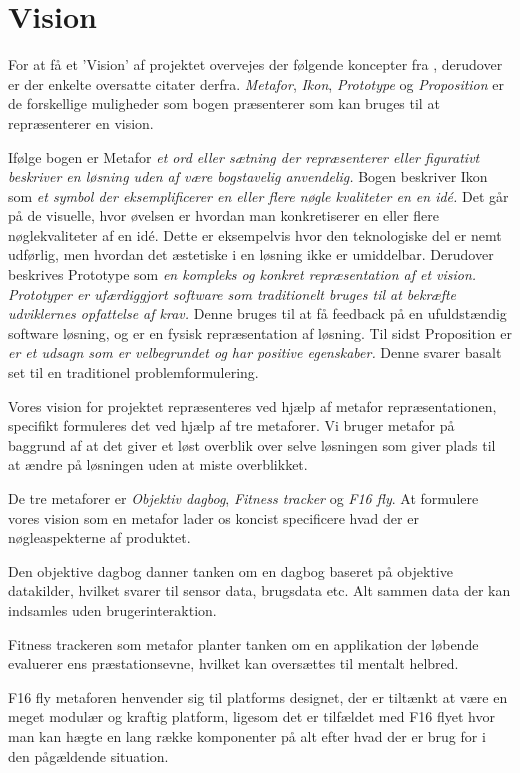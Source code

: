 \section{Vision}
For at få et 'Vision' af projektet overvejes der følgende koncepter fra \citep{art:essence}, derudover er der enkelte oversatte citater derfra.
\textit{Metafor}, \textit{Ikon}, \textit{Prototype} og \textit{Proposition} er de forskellige muligheder som bogen præsenterer som kan bruges til at repræsenterer en vision.

Ifølge bogen er Metafor \textit{et ord eller sætning der repræsenterer eller figurativt beskriver en løsning uden af være bogstavelig anvendelig.}
Bogen beskriver Ikon som \textit{et symbol der eksemplificerer en eller flere nøgle kvaliteter en en idé.} Det går på de visuelle, hvor øvelsen er hvordan man konkretiserer en eller flere nøglekvaliteter af en idé. Dette er eksempelvis hvor den teknologiske del er nemt udførlig, men hvordan det æstetiske i en løsning ikke er umiddelbar.
Derudover beskrives Prototype som \textit{en kompleks og konkret repræsentation af et vision. Prototyper er ufærdiggjort software som traditionelt bruges til at bekræfte udviklernes opfattelse af krav.} Denne bruges til at få feedback på en ufuldstændig software løsning, og er en fysisk repræsentation af løsning. 
Til sidst Proposition er \textit{er et udsagn som er velbegrundet og har positive egenskaber.} Denne svarer basalt set til en traditionel problemformulering. 

Vores vision for projektet repræsenteres ved hjælp af metafor repræsentationen, specifikt formuleres det ved hjælp af tre metaforer.
Vi bruger metafor på baggrund af at det giver et løst overblik over selve løsningen som giver plads til at ændre på løsningen uden at miste overblikket. 

De tre metaforer er \textit{Objektiv dagbog}, \textit{Fitness tracker} og \textit{F16 fly}.
At formulere vores vision som en metafor lader os koncist specificere hvad der er nøgleaspekterne af produktet.

Den objektive dagbog danner tanken om en dagbog baseret på objektive datakilder, hvilket svarer til sensor data, brugsdata etc.
Alt sammen data der kan indsamles uden brugerinteraktion.

Fitness trackeren som metafor planter tanken om en applikation der løbende evaluerer ens præstationsevne, hvilket kan oversættes til mentalt helbred.

F16 fly metaforen henvender sig til platforms designet, der er tiltænkt at være en meget modulær og kraftig platform, ligesom det er tilfældet med F16 flyet hvor man kan hægte en lang række komponenter på alt efter hvad der er brug for i den pågældende situation.